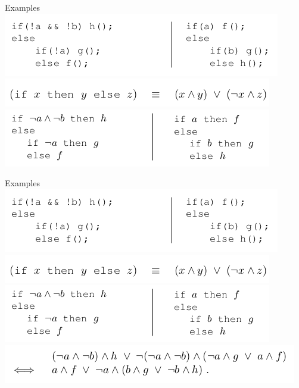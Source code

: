 \documentclass[mathserif]{beamer}
\begin{document}
\begin{frame}{Examples}
\includegraphics[scale=0.5]{equivalent1.png}
\includegraphics[scale=0.5]{equivalent2.png}
\includegraphics[scale=0.5]{equivalent3.png}
\end{frame}

\begin{frame}{Examples}
\includegraphics[scale=0.5]{equivalent1.png}
\includegraphics[scale=0.5]{equivalent2.png}
\includegraphics[scale=0.5]{equivalent3.png}
\includegraphics[scale=0.5]{equivalent4.png}
\end{frame}
\end{document}
